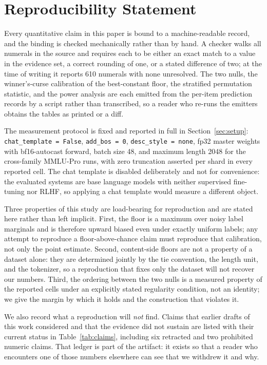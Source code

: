 \section*{Reproducibility Statement}

Every quantitative claim in this paper is bound to a machine-readable record, and the
binding is checked mechanically rather than by hand. A checker walks all numerals in the
source and requires each to be either an exact match to a value in the evidence set, a
correct rounding of one, or a stated difference of two; at the time of writing it reports
610 numerals with none unresolved. The two nulls, the winner's-curse calibration of the
best-constant floor, the stratified permutation statistic, and the power analysis are each
emitted from the per-item prediction records by a script rather than transcribed, so a
reader who re-runs the emitters obtains the tables as printed or a diff.

The measurement protocol is fixed and reported in full in
Section~\ref{sec:setup}: \texttt{chat\_template = False}, \texttt{add\_bos = 0},
\texttt{desc\_style = none}, fp32 master weights with bf16-autocast forward, batch size 48,
and maximum length 2048 for the cross-family MMLU-Pro runs, with zero truncation asserted
per shard in every reported cell. The chat template is disabled deliberately and not for
convenience: the evaluated systems are base language models with neither supervised
fine-tuning nor RLHF, so applying a chat template would measure a different object.

Three properties of this study are load-bearing for reproduction and are stated here
rather than left implicit. First, the floor is a maximum over noisy label marginals and is
therefore upward biased even under exactly uniform labels; any attempt to reproduce a
floor-above-chance claim must reproduce that calibration, not only the point estimate.
Second, content-side floors are not a property of a dataset alone: they are determined
jointly by the tie convention, the length unit, and the tokenizer, so a reproduction that
fixes only the dataset will not recover our numbers. Third, the ordering between the two
nulls is a measured property of the reported cells under an explicitly stated regularity
condition, not an identity; we give the margin by which it holds and the construction that
violates it.

We also record what a reproduction will \emph{not} find. Claims that earlier drafts of this
work considered and that the evidence did not sustain are listed with their current status
in Table~\ref{tab:claims}, including six retracted and two prohibited numeric claims. That
ledger is part of the artifact: it exists so that a reader who encounters one of those
numbers elsewhere can see that we withdrew it and why.
